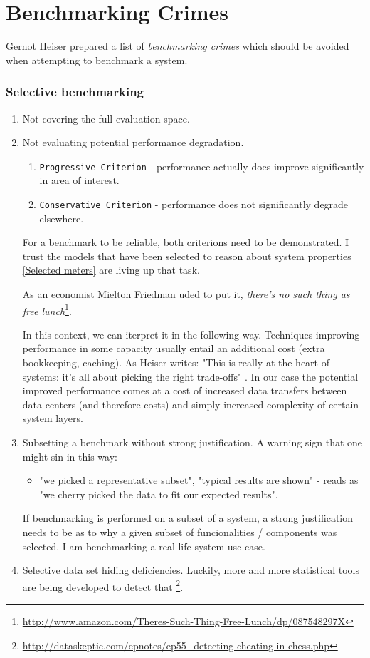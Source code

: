 \documentclass{uvamscse}
\begin{document}
\section{Benchmarking Crimes}

Gernot Heiser prepared a list \cite{GerHeiBench} of \textit{benchmarking crimes} which should be avoided when attempting to benchmark a system.

\subsubsection{Selective benchmarking}
\begin{enumerate}
  \item Not covering the full evaluation space.
  \item Not evaluating potential performance degradation.
    \begin{enumerate}
      \item \texttt{Progressive Criterion} - performance actually does improve significantly in area of interest.
      \item \texttt{Conservative Criterion} - performance does not significantly degrade elsewhere.
    \end{enumerate}
    For a benchmark to be reliable, both criterions need to be demonstrated. I trust the models that have been selected to reason about system properties \ref{Selected meters} are living up that task.

    As an economist Mielton Friedman uded to put it, \textit{there's no such thing as free lunch}\footnote{\url{http://www.amazon.com/Theres-Such-Thing-Free-Lunch/dp/087548297X}}.

    In this context, we can iterpret it in the following way. Techniques improving performance in some capacity usually entail an additional cost (extra bookkeeping, caching). As Heiser writes: "This is really at the heart of systems: it's all about picking the right trade-offs" \cite{GerHeiBench}. In our case the potential improved performance comes at a cost of increased data transfers between data centers (and therefore costs) and simply increased complexity of certain system layers.
  \item Subsetting a benchmark without strong justification. A warning sign that one might sin in this way:
    \begin{itemize}
      \item "we picked a representative subset", "typical results are shown" - reads as "we cherry picked the data to fit our expected results".
    \end{itemize}
    If benchmarking is performed on a subset of a system, a strong justification needs to be as to why a given subset of funcionalities / components was selected. I am benchmarking a real-life system use case.
  \item Selective data set hiding deficiencies. Luckily, more and more statistical tools are being developed to detect that \footnote{\url{http://dataskeptic.com/epnotes/ep55_detecting-cheating-in-chess.php}}.
\end{enumerate}
\end{document}
